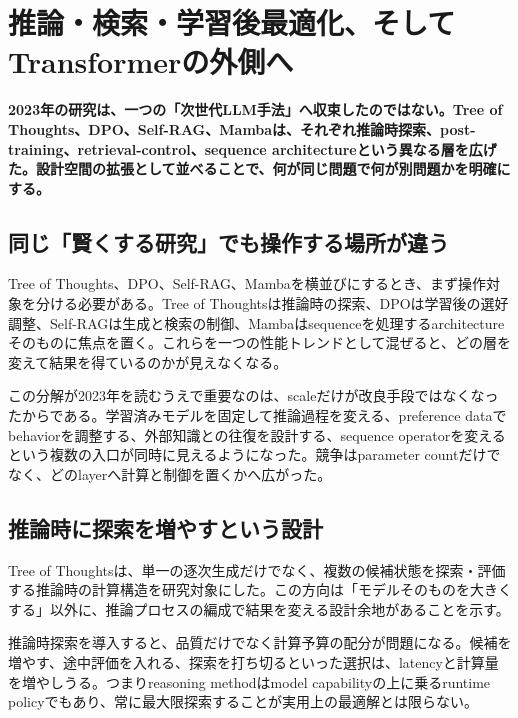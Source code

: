 \section{推論・検索・学習後最適化、そしてTransformerの外側へ}
\label{pkg:reasoning-retrieval-architecture}
\noindent\textbf{2023年の研究は、一つの「次世代LLM手法」へ収束したのではない。Tree of Thoughts、DPO、Self-RAG、Mambaは、それぞれ推論時探索、post-training、retrieval-control、sequence architectureという異なる層を広げた。設計空間の拡張として並べることで、何が同じ問題で何が別問題かを明確にする。}\autocite{src-21aef0026892,src-5dd64e15cc75,src-8a38211129c4,src-e413c7ab8da4}

\subsection{同じ「賢くする研究」でも操作する場所が違う}

Tree of Thoughts、DPO、Self-RAG、Mambaを横並びにするとき、まず操作対象を分ける必要がある。Tree of Thoughtsは推論時の探索、DPOは学習後の選好調整、Self-RAGは生成と検索の制御、Mambaはsequenceを処理するarchitectureそのものに焦点を置く。これらを一つの性能トレンドとして混ぜると、どの層を変えて結果を得ているのかが見えなくなる。\autocite{src-21aef0026892,src-5dd64e15cc75,src-8a38211129c4,src-e413c7ab8da4}


この分解が2023年を読むうえで重要なのは、scaleだけが改良手段ではなくなったからである。学習済みモデルを固定して推論過程を変える、preference dataでbehaviorを調整する、外部知識との往復を設計する、sequence operatorを変えるという複数の入口が同時に見えるようになった。競争はparameter countだけでなく、どのlayerへ計算と制御を置くかへ広がった。\autocite{src-21aef0026892,src-5dd64e15cc75,src-8a38211129c4,src-e413c7ab8da4}


\subsection{推論時に探索を増やすという設計}

Tree of Thoughtsは、単一の逐次生成だけでなく、複数の候補状態を探索・評価する推論時の計算構造を研究対象にした。この方向は「モデルそのものを大きくする」以外に、推論プロセスの編成で結果を変える設計余地があることを示す。\autocite{src-8a38211129c4}


推論時探索を導入すると、品質だけでなく計算予算の配分が問題になる。候補を増やす、途中評価を入れる、探索を打ち切るといった選択は、latencyと計算量を増やしうる。つまりreasoning methodはmodel capabilityの上に乗るruntime policyでもあり、常に最大限探索することが実用上の最適解とは限らない。\autocite{src-8a38211129c4}


